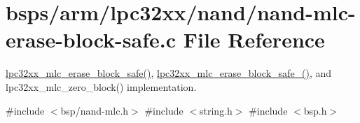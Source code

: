 \hypertarget{nand-mlc-erase-block-safe_8c}{}\section{bsps/arm/lpc32xx/nand/nand-\/mlc-\/erase-\/block-\/safe.c File Reference}
\label{nand-mlc-erase-block-safe_8c}


\mbox{\hyperlink{group__lpc32xx__nand__mlc_gab3b2378535527c368dd10f78a4eca68c}{lpc32xx\+\_\+mlc\+\_\+erase\+\_\+block\+\_\+safe()}}, \mbox{\hyperlink{group__lpc32xx__nand__mlc_gab7abd0702699aa8db9c2acb4eb55258c}{lpc32xx\+\_\+mlc\+\_\+erase\+\_\+block\+\_\+safe\+\_()}}, and lpc32xx\+\_\+mlc\+\_\+zero\+\_\+block() implementation.  


{\ttfamily \#include $<$bsp/nand-\/mlc.\+h$>$}\newline
{\ttfamily \#include $<$string.\+h$>$}\newline
{\ttfamily \#include $<$bsp.\+h$>$}\newline
